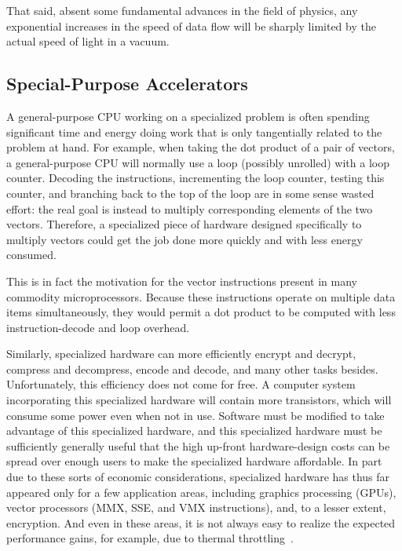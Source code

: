 That said, absent some fundamental advances in the field of physics,
any exponential increases in the speed of data flow
will be sharply limited by the actual speed of light in a vacuum.

\fi

\subsection{Special-Purpose Accelerators}
\label{sec:cpu:Special-Purpose Accelerators}

A general-purpose CPU working on a specialized problem is often spending
significant time and energy doing work that is only tangentially related
to the problem at hand.
For example, when taking the dot product of a pair of vectors, a
general-purpose CPU will normally use a loop (possibly unrolled)
with a loop counter.
Decoding the instructions, incrementing the loop counter, testing this
counter, and branching back to the
top of the loop are in some sense wasted effort: the real goal is
instead to multiply corresponding elements of the two vectors.
Therefore, a specialized piece of hardware designed specifically to
multiply vectors could get the job done more quickly and with less
energy consumed.

This is in fact the motivation for the vector instructions present in
many commodity microprocessors.
Because these instructions operate on multiple data items simultaneously,
they would permit a dot product to be computed with less instruction-decode
and loop overhead.

Similarly, specialized hardware can more efficiently encrypt and decrypt,
compress and decompress, encode and decode, and many other tasks besides.
Unfortunately, this efficiency does not come for free.
A computer system incorporating this specialized hardware will contain
more transistors, which will consume some power even when not in use.
Software must be modified to take advantage of this specialized hardware,
and this specialized hardware must be sufficiently generally useful
that the high up-front hardware-design costs can be spread over enough
users to make the specialized hardware affordable.
In part due to these sorts of economic considerations, specialized
hardware has thus far appeared only for a few application areas,
including graphics processing (GPUs), vector processors (MMX, SSE,
and VMX instructions), and, to a lesser extent, encryption.
And even in these areas, it is not always easy to realize the expected
performance gains, for example, due to thermal
throttling~\cite{VladKrasnov2017SIMDfreqscale,DanielLemire2018SIMDfreqscale,TravisDowns2020SIMDfreqscale}.

